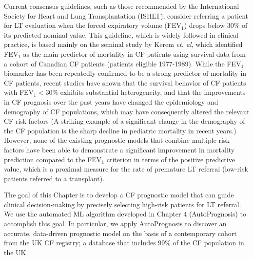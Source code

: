 \documentclass [PhD] {uclathes}
\begin{document}
Current consensus guidelines, such as those recommended by the International Society for Heart and Lung Transplantation (ISHLT)\cite{weill2015consensus}, consider referring a patient for LT evaluation when the forced expiratory volume (FEV$_1$) drops below 30$\%$ of its predicted nominal value. This guideline, which is widely followed in clinical practice\cite{hook2012selecting,hirche2014practical}, is based mainly on the seminal study by Kerem {\it et. al}\cite{kerem1992prediction}, which identified FEV$_1$ as the main predictor of mortality in CF patients using survival data from a cohort of Canadian CF patients (patients eligible 1977-1989). While the FEV$_1$ biomarker has been repeatedly confirmed to be a strong predictor of mortality in CF patients\cite{milla1998risk,mayer2002developing,wojewodka2014candidate}, recent studies have shown that the survival behavior of CF patients with FEV$_1<$30$\%$ exhibits substantial heterogeneity\cite{heterogg}, and that the improvements in CF prognosis over the past years have changed the epidemiology and demography of CF populations\cite{urquhart2013deaths,stephenson2017changing}, which may have consequently altered the relevant CF risk factors (A striking example of a significant change in the demography of the CF population is the sharp decline in pediatric mortality in recent years\cite{urquhart2013deaths}.) However, none of the existing prognostic models that combine multiple risk factors\cite{hayllar1997prognostic,liou2001predictive,buzzetti2012validation,aaron2015statistical} have been able to demonstrate a significant improvement in mortality prediction compared to the FEV$_1$ criterion in terms of the positive predictive value, which is a proximal measure for the rate of premature LT referral (low-risk patients referred to a transplant)\cite{mayer2002developing}. 

The goal of this Chapter is to develop a CF prognostic model that can guide clinical decision-making by precisely selecting high-risk patients for LT referral. We use the automated ML algorithm developed in Chapter 4 (AutoPrognosis) to accomplish this goal. In particular, we apply AutoPrognosis to discover an accurate, data-driven prognostic model on the basis of a contemporary cohort from the UK CF registry; a database that includes 99$\%$ of the CF population in the UK\cite{CFReg,CFReg2,fink2017data}. 
\end{document}

